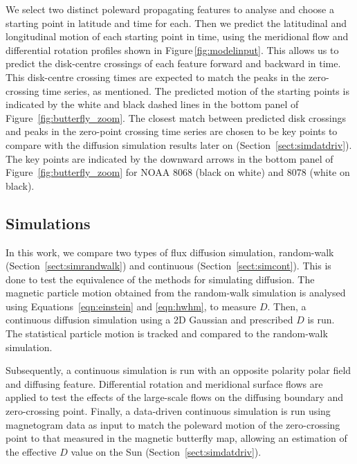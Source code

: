 We select two distinct poleward propagating features to analyse and choose a starting point in latitude and time for each. Then we predict the latitudinal and longitudinal motion of each starting point in time, using the meridional flow and differential rotation profiles shown in Figure\,\ref{fig:modelinput}. This allows us to predict the disk-centre crossings of each feature forward and backward in time. This disk-centre crossing times are expected to match the peaks in the zero-crossing time series, as mentioned.
The predicted motion of the starting points is indicated by the white and black dashed lines in the bottom panel of Figure~\ref{fig:butterfly_zoom}. The closest match between predicted disk crossings and peaks in the zero-point crossing time series are chosen to be key points to compare with the diffusion simulation results later on (Section~\ref{sect:simdatdriv}). The key points are indicated by the downward arrows in the bottom panel of Figure~\ref{fig:butterfly_zoom} for \gls{NOAA} 8068 (black on white) and 8078 (white on black).


\subsection{Simulations}\label{sect:sims}

In this work, we compare two types of flux diffusion simulation, random-walk (Section~\ref{sect:simrandwalk}) and continuous (Section~\ref{sect:simcont}). This is done to test the equivalence of the methods for simulating diffusion. The magnetic particle motion obtained from the random-walk simulation is analysed using Equations~\ref{eqn:einstein} and \ref{eqn:hwhm}, to measure $D$. Then, a continuous diffusion simulation using a 2D Gaussian and prescribed $D$ is run. The statistical particle motion is tracked and compared to the random-walk simulation. 

Subsequently, a continuous simulation is run with an opposite polarity polar field and diffusing feature. Differential rotation and meridional surface flows are applied to test the effects of the large-scale flows on the diffusing boundary and zero-crossing point. Finally, a data-driven continuous simulation is run using magnetogram data as input to match the poleward motion of the zero-crossing point to that measured in the magnetic butterfly map, allowing an estimation of the effective $D$ value on the Sun (Section~\ref{sect:simdatdriv}).

